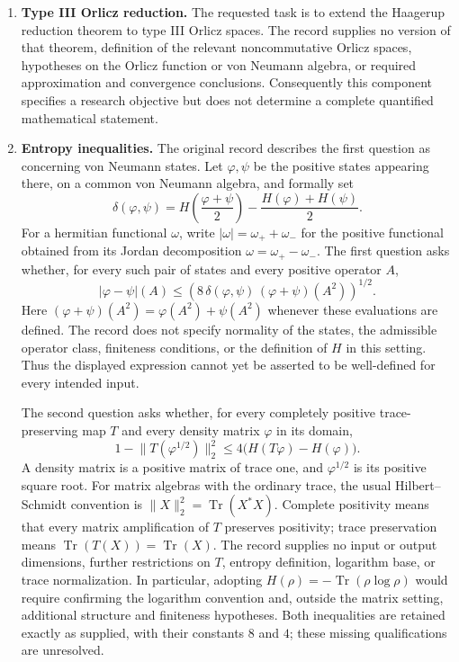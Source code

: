 \documentclass[11pt]{article}
\begin{document}
\begin{enumerate}
\item \textbf{Type III Orlicz reduction.} The requested task is to extend the Haagerup reduction theorem to type III Orlicz spaces. The record supplies no version of that theorem, definition of the relevant noncommutative Orlicz spaces, hypotheses on the Orlicz function or von Neumann algebra, or required approximation and convergence conclusions. Consequently this component specifies a research objective but does not determine a complete quantified mathematical statement.

\item \textbf{Entropy inequalities.} The original record describes the first question as concerning von Neumann states. Let \(\varphi,\psi\) be the positive states appearing there, on a common von Neumann algebra, and formally set
\[
 \delta(\varphi,\psi)
 =H\!\left(\frac{\varphi+\psi}{2}\right)
  -\frac{H(\varphi)+H(\psi)}{2}.
\]
For a hermitian functional \(\omega\), write \(|\omega|=\omega_++\omega_-\) for the positive functional obtained from its Jordan decomposition \(\omega=\omega_+-\omega_-\). The first question asks whether, for every such pair of states and every positive operator \(A\),
\[
 |\varphi-\psi|(A)
 \leq
 \left(8\,\delta(\varphi,\psi)\,(\varphi+\psi)(A^2)\right)^{1/2}.
\]
Here \((\varphi+\psi)(A^2)=\varphi(A^2)+\psi(A^2)\) whenever these evaluations are defined. The record does not specify normality of the states, the admissible operator class, finiteness conditions, or the definition of \(H\) in this setting. Thus the displayed expression cannot yet be asserted to be well-defined for every intended input.

The second question asks whether, for every completely positive trace-preserving map \(T\) and every density matrix \(\varphi\) in its domain,
\[
 1-\bigl\|T(\varphi^{1/2})\bigr\|_2^2
 \leq 4\bigl(H(T\varphi)-H(\varphi)\bigr).
\]
A density matrix is a positive matrix of trace one, and \(\varphi^{1/2}\) is its positive square root. For matrix algebras with the ordinary trace, the usual Hilbert--Schmidt convention is \(\|X\|_2^2=\operatorname{Tr}(X^*X)\). Complete positivity means that every matrix amplification of \(T\) preserves positivity; trace preservation means \(\operatorname{Tr}(T(X))=\operatorname{Tr}(X)\). The record supplies no input or output dimensions, further restrictions on \(T\), entropy definition, logarithm base, or trace normalization. In particular, adopting \(H(\rho)=-\operatorname{Tr}(\rho\log\rho)\) would require confirming the logarithm convention and, outside the matrix setting, additional structure and finiteness hypotheses. Both inequalities are retained exactly as supplied, with their constants \(8\) and \(4\); these missing qualifications are unresolved.


\end{enumerate}
\end{document}
